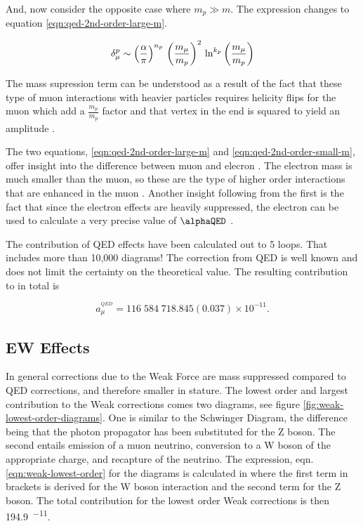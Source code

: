 \noindent
And, now consider the opposite case where $m_p \gg m$.  The expression changes to equation \ref{eqn:qed-2nd-order-large-m}.

\begin{equation}
\label{eqn:qed-2nd-order-large-m}
\delta_\mu^p \sim \left( \frac{\alpha}{\pi} \right)^{n_p} \\
\left( \frac{m_\mu}{m_p} \right)^2 \\
\ln^{k_p} \left( \frac{m_\mu}{m_p} \right)
\end{equation}

\noindent
The mass supression term can be understood as a result of the fact that these type of muon interactions with heavier particles requires helicity flips for the muon which add a $\frac{m_\mu}{m_p}$ factor and that vertex in the end is squared to yield an amplitude \cite{amm-of-muon}.

The two equations, \ref{eqn:qed-2nd-order-large-m} and \ref{eqn:qed-2nd-order-small-m}, offer insight into the difference between muon and elecron \gmtwo.  The electron mass is much smaller than the muon, so these are the type of higher order interactions that are enhanced in the muon \gmtwo.  Another insight following from the first is the fact that since the electron effects are heavily suppressed, the electron \gmtwo can be used to calculate a very precise value of $\alphaQED$ \cite{amm-of-muon}.

The contribution of QED effects have been calculated out to 5 loops\cite{5-loop-qed}.  That includes more than 10,000 diagrams!  The correction from QED is well known and does not limit the certainty on the theoretical value.  The resulting contribution to \mugmtwo in total is

\begin{equation}
\label{eqn:qed-total}
a_\mu^{^{QED}} = 116\;584\;718.845(0.037) \times 10^{-11}.
\end{equation}

\subsection{EW Effects} \label{s-sec:theory-ew}

In general corrections due to the Weak Force are mass suppressed compared to QED corrections, and therefore smaller in stature.  The lowest order and largest contribution to the Weak corrections comes two diagrams, see figure \ref{fig:weak-lowest-order-diagrams}. One is similar to the Schwinger Diagram, the difference being that the photon propagator has been substituted for the Z boson.  The second entails emission of a muon neutrino, conversion to a W boson of the appropriate charge, and recapture of the neutrino.  The expression, eqn. \ref{eqn:weak-lowest-order} for the diagrams is calculated in\cite{the-muon-g-2} where the first term in brackets is derived for the W boson interaction and the second term for the Z boson.  The total contribution for the lowest order Weak corrections is then \SI{194.9}{^{-11}}.

